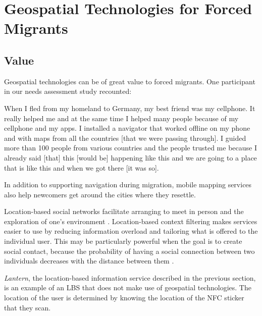\section{Geospatial Technologies for Forced Migrants}
\label{sec:geospatial_technologies}

\subsection*{Value}

Geospatial technologies can be of great value to forced migrants. One participant in our needs assessment study recounted:

\begin{displayquote}
When I fled from my homeland to Germany, my best friend was my cellphone. It really helped me and at the same time I helped many people because of my cellphone and my apps. I installed a navigator that worked offline on my phone and with maps from all the countries [that we were passing through]. I guided more than 100 people from various countries and the people trusted me because I already said [that] this [would be] happening like this and we are going to a place that is like this and when we got there [it was so].
\end{displayquote} %

In addition to supporting navigation during migration, mobile mapping services also help newcomers get around the cities where they resettle. %

Location-based social networks facilitate arranging to meet in person and the exploration of one’s environment \cite{lee_location-based_2013}. Location-based context filtering makes services easier to use by reducing information overload and tailoring what is offered to the individual user. This may be particularly powerful when the goal is to create social contact, because the probability of having a social connection between two individuals decreases with the distance between them \cite{scellato_socio-spatial_2011}.

\textit{Lantern}, the location-based information service described in the previous section, is an example of an LBS that does not make use of geospatial technologies. The location of the user is determined by knowing the location of the NFC sticker that they scan.





